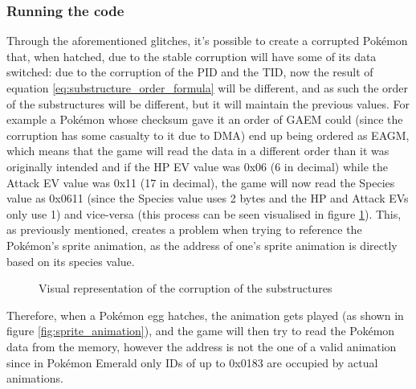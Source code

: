 \documentclass[a4paper]{usiinfbachelorproject}
\begin{document}
\subsubsection{Running the code}
\label{sec:running_the_code}
Through the aforementioned glitches, it's possible to create a corrupted Pokémon that, when hatched, due to the stable corruption will have some of its data switched: due to the corruption of the PID and the TID, now the result of equation \ref{eq:substructure_order_formula} will be different, and as such the order of the substructures will be different, but it will maintain the previous values. For example a Pokémon whose checksum gave it an order of GAEM could (since the corruption has some casualty to it due to DMA) end up being ordered as EAGM, which means that the game will read the data in a different order than it was originally intended and if the HP EV value was 0x06 (6 in decimal) while the Attack EV value was 0x11 (17 in decimal), the game will now read the Species value as 0x0611 (since the Species value uses 2 bytes and the HP and Attack EVs only use 1) and vice-versa (this process can be seen visualised in figure \ref{fig:corruption_substructures}). This, as previously mentioned, creates a problem when trying to reference the Pokémon's sprite animation, as the address of one's sprite animation is directly based on its species value.

\begin{figure}[h!]
	\caption{Visual representation of the corruption of the substructures}
	\label{fig:corruption_substructures}
\end{figure}

Therefore, when a Pokémon egg hatches, the animation gets played (as shown in figure \ref{fig:sprite_animation}), and the game will then try to read the Pokémon data from the memory, however the address is not the one of a valid animation since in Pokémon Emerald only IDs of up to 0x0183 are occupied by actual animations.
\end{document}
